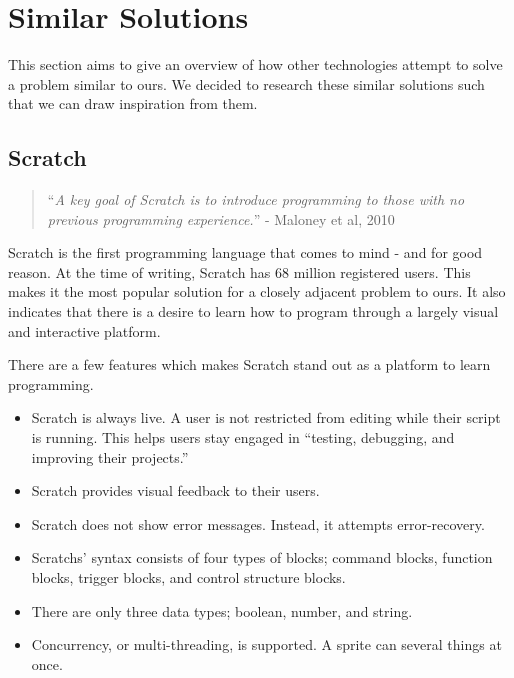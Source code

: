 \section{Similar Solutions}
This section aims to give an overview of how other technologies attempt to solve a problem similar to ours. We decided to research these similar solutions such that we can draw inspiration from them.

\subsection{Scratch}\label{ScratchSection}
\begin{quote}
    ``\emph{A key goal of Scratch is to introduce programming to those with no previous programming experience.}'' - Maloney et al, 2010\cite{maloneyScratchProgrammingLanguage2010}
\end{quote}

Scratch\cite{ScratchImagineProgram} is the first programming language that comes to mind - and for good reason. At the time of writing, Scratch has 68 million registered users\cite{ScratchImagineProgramStatistics}. This makes it the most popular solution for a closely adjacent problem to ours. It also indicates that there is a desire to learn how to program through a largely visual and interactive platform.


There are a few features which makes Scratch stand out as a platform to learn programming.
\begin{itemize}
    \item Scratch is always live. A user is not restricted from editing while their script is running. This helps users stay engaged in ``testing, debugging, and improving their projects.''\cite{maloneyScratchProgrammingLanguage2010}
    \item Scratch provides visual feedback to their users.\cite{maloneyScratchProgrammingLanguage2010}
    \item Scratch does not show error messages. Instead, it attempts error-recovery.\cite{maloneyScratchProgrammingLanguage2010}
    \item Scratchs' syntax consists of four types of blocks; command blocks, function blocks, trigger blocks, and control structure blocks.\cite{maloneyScratchProgrammingLanguage2010}
    \item There are only three data types; boolean, number, and string.\cite{maloneyScratchProgrammingLanguage2010}
    \item Concurrency, or multi-threading, is supported. A sprite can several things at once.\cite{maloneyScratchProgrammingLanguage2010}
\end{itemize}

